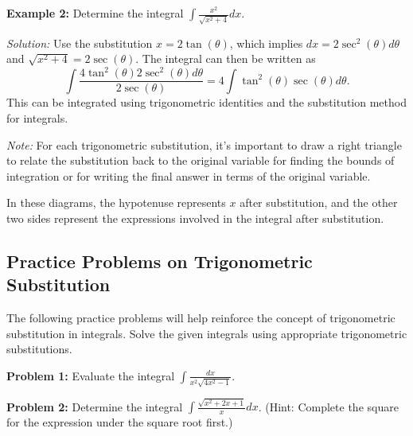 \documentclass[a4paper,12pt]{book}
\newcounter{problem}
\begin{document}
\textbf{Example 2:}
Determine the integral \( \int \frac{x^2}{\sqrt{x^2 + 4}} dx \).

\textit{Solution:} Use the substitution \( x = 2\tan(\theta) \), which implies \( dx = 2\sec^2(\theta)d\theta \) and \( \sqrt{x^2 + 4} = 2\sec(\theta) \). The integral can then be written as
\[ \int \frac{4\tan^2(\theta)2\sec^2(\theta)d\theta}{2\sec(\theta)} = 4\int \tan^2(\theta)\sec(\theta)d\theta. \]
This can be integrated using trigonometric identities and the substitution method for integrals.

\textit{Note:} For each trigonometric substitution, it's important to draw a right triangle to relate the substitution back to the original variable for finding the bounds of integration or for writing the final answer in terms of the original variable.

\begin{center}
\end{center}

In these diagrams, the hypotenuse represents \( x \) after substitution, and the other two sides represent the expressions involved in the integral after substitution.

\subsection{Practice Problems on Trigonometric Substitution}
\label{subsec:practice_problems_trig_sub}

The following practice problems will help reinforce the concept of trigonometric substitution in integrals. Solve the given integrals using appropriate trigonometric substitutions.

\textbf{Problem 1:}
Evaluate the integral \( \int \frac{dx}{x^2\sqrt{4x^2 - 1}} \).

\textbf{Problem 2:}
Determine the integral \( \int \frac{\sqrt{x^2 + 2x + 1}}{x} dx \). (Hint: Complete the square for the expression under the square root first.)
\end{document}
